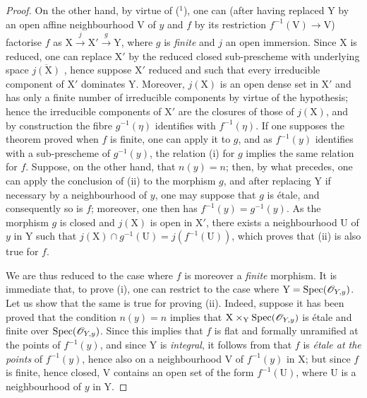 \begin{proof}
On the other hand, by virtue of  (${}^1$), one can (after having replaced $\mathrm{Y}$ by an open affine neighbourhood $\mathrm{V}$ of $y$ and $f$ by its restriction $f^{-1}(\mathrm{V})\to\mathrm{V}$) factorise $f$ as $\mathrm{X}\xrightarrow{j}\mathrm{X}'\xrightarrow{g}\mathrm{Y}$, where $g$ is \emph{finite} and $j$ an open immersion.
Since $\mathrm{X}$ is reduced, one can replace $\mathrm{X}'$ by the reduced closed sub-prescheme with underlying space $\overline{j(\mathrm{X})}$ , hence suppose $\mathrm{X}'$ reduced and such that every irreducible component of $\mathrm{X}'$ dominates $\mathrm{Y}$.
Moreover, $j(\mathrm{X})$ is an open dense set in $\mathrm{X}'$ and has only a finite number of irreducible components by virtue of the hypothesis; hence  the irreducible components of $\mathrm{X}'$ are the closures of those of $j(\mathrm{X})$, and by construction the fibre $g^{-1}(\eta)$ identifies with $f^{-1}(\eta)$.
If one supposes the theorem proved when $f$ is finite, one can apply it to $g$, and as $f^{-1}(y)$ identifies with a sub-prescheme of $g^{-1}(y)$, the relation (i) for $g$ implies the same relation for $f$.
Suppose, on the other hand, that $n(y)=n$; then, by what precedes, one can apply the conclusion of (ii) to the morphism $g$, and after replacing $\mathrm{Y}$ if necessary by a neighbourhood of $y$, one may suppose that $g$ is \'etale, and consequently so is $f$; moreover, one then has $f^{-1}(y)=g^{-1}(y)$.
As the morphism $g$ is closed and $j(\mathrm{X})$ is open in $\mathrm{X}'$, there exists a neighbourhood $\mathrm{U}$ of $y$ in $\mathrm{Y}$ such that $j(\mathrm{X})\cap g^{-1}(\mathrm{U})=j(f^{-1}(\mathrm{U}))$, which proves that (ii) is also true for $f$.

We are thus reduced to the case where $f$ is moreover a \emph{finite} morphism.
It is immediate that, to prove (i), one can restrict to the case where $\mathrm{Y}=\operatorname{Spec}(\mathscr{O}_{Y,y})$.
Let us show that the same is true for proving (ii).
Indeed, suppose it has been proved that the condition $n(y)=n$ implies that $\mathrm{X}\times_{\mathrm{Y}}\operatorname{Spec}(\mathscr{O}_{Y,y})$ is \'etale and finite over $\operatorname{Spec}(\mathscr{O}_{Y,y})$. Since this implies that $f$ is flat and formally unramified at the points of $f^{-1}(y)$, and since $\mathrm{Y}$ is \emph{integral}, it follows from  that $f$ is \emph{\'etale at the points} of $f^{-1}(y)$, hence also on a neighbourhood $\mathrm{V}$ of $f^{-1}(y)$ in $\mathrm{X}$; but since $f$ is finite, hence closed, $\mathrm{V}$ contains an open set of the form $f^{-1}(\mathrm{U})$, where $\mathrm{U}$ is a neighbourhood of $y$ in $\mathrm{Y}$.


\end{proof}

